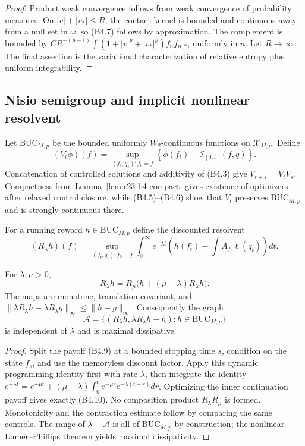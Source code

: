 \begin{proof}
Product weak convergence follows from weak convergence of probability
measures.  On $|v|+|v_*|\le R$, the contact kernel is bounded and continuous
away from a null set in $\omega$, so (B4.7) follows by approximation.  The
complement is bounded by
$C R^{-(p-1)}\int(1+|v|^p+|v_*|^p)f_n f_{n,*}$, uniformly in $n$.
Let $R\to\infty$.  The final assertion is the variational characterization of
relative entropy plus uniform integrability.
\end{proof}

\subsection{Nisio semigroup and implicit nonlinear resolvent}

Let $\mathrm{BUC}_{M,p}$ be the bounded uniformly $W_2$-continuous functions
on $\mathcal X_{M,p}$.  Define
\[
 (V_t\phi)(f)=\sup_{(f_s,q_s):f_0=f}
 \left\{\phi(f_t)-\mathcal I_{[0,t]}(f,q)\right\}.        \tag{B4.8}
\]
Concatenation of controlled solutions and additivity of (B4.3) give
$V_{t+s}=V_tV_s$.  Compactness from
Lemma~\ref{lem:r23-b4-compact} gives existence of optimizers after relaxed
control closure, while (B4.5)--(B4.6) show that $V_t$ preserves
$\mathrm{BUC}_{M,p}$ and is strongly continuous there.

For a running reward $h\in\mathrm{BUC}_{M,p}$ define the discounted resolvent
\[
 (R_\lambda h)(f)=\sup_{(f_t,q_t):f_0=f}
 \int_0^\infty e^{-\lambda t}
 \left(h(f_t)-\int A_{f_t}\ell(q_t)\right)dt.            \tag{B4.9}
\]

\begin{theorem}
\label{thm:r23-b4-resolvent}
For $\lambda,\mu>0$,
\[
 R_\lambda h
 =R_\mu\bigl(h+(\mu-\lambda)R_\lambda h\bigr).          \tag{B4.10}
\]
The maps are monotone, translation covariant, and
$\|\lambda R_\lambda h-\lambda R_\lambda g\|_\infty
\le\|h-g\|_\infty$.  Consequently the graph
\[
 \mathcal A=\{(R_\lambda h,\lambda R_\lambda h-h):h\in
 \mathrm{BUC}_{M,p}\}                                   \tag{B4.11}
\]
is independent of $\lambda$ and is maximal dissipative.
\end{theorem}

\begin{proof}
Split the payoff (B4.9) at a bounded stopping time $s$, condition on the state
$f_s$, and use the memoryless discount factor.  Apply this dynamic programming
identity first with rate $\lambda$, then integrate the identity
$e^{-\lambda t}=e^{-\mu t}+(\mu-\lambda)
\int_0^te^{-\mu r}e^{-\lambda(t-r)}dr$.  Optimizing the inner continuation
payoff gives exactly (B4.10).  No composition product
$R_\lambda R_\mu$ is formed.  Monotonicity and the contraction estimate follow
by comparing the same controls.  The range of
$\lambda-\mathcal A$ is all of $\mathrm{BUC}_{M,p}$ by construction; the
nonlinear Lumer--Phillips theorem yields maximal dissipativity.
\end{proof}

